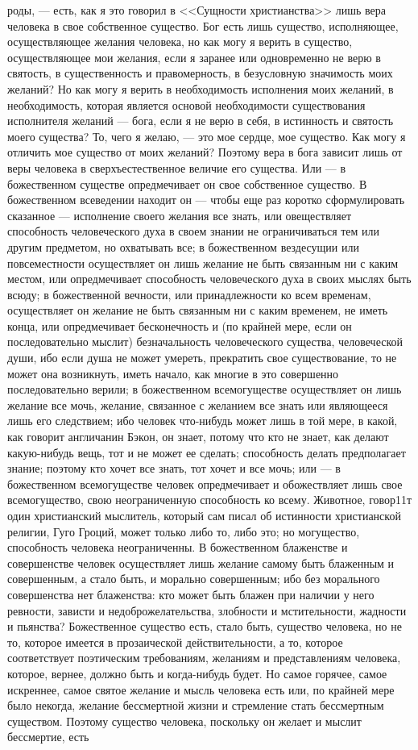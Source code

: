 \documentclass[12pt]{article}
\begin{document}
роды, --- есть, как я это говорил в <<Сущности христианства>>  лишь вера человека в свое собственное существо. Бог есть лишь существо, исполняющее, осуществляющее желания человека, но как могу я верить в существо, осуществляющее мои желания, если я заранее или одновременно не верю в святость, в существенность и правомерность, в безусловную значимость моих желаний? Но как могу я верить в необходимость исполнения моих желаний, в необходимость, которая является основой необходимости существования исполнителя желаний --- бога, если я не верю в себя, в истинность и святость моего существа? То, чего я желаю, --- это мое сердце, мое существо. Как могу я отличить мое существо от моих желаний? Поэтому вера в бога зависит лишь от веры человека в сверхъестественное величие его существа. Или --- в божественном существе опредмечивает он свое собственное существо. В божественном всеведении находит он --- чтобы еще раз коротко сформулировать сказанное --- исполнение своего желания все знать, или овеществляет способность человеческого духа в своем знании не ограничиваться тем или другим предметом, но охватывать все; в божественном вездесущии или повсеместности осуществляет он лишь желание не быть связанным ни с каким местом, или опредмечивает способность человеческого духа в своих мыслях быть всюду; в божественной вечности, или принадлежности ко всем временам, осуществляет он желание не быть связанным ни с каким временем, не иметь конца, или опредмечивает бесконечность и (по крайней мере, если он последовательно мыслит) безначальность человеческого существа, человеческой души, ибо если душа не может умереть, прекратить свое существование, то не может она возникнуть, иметь начало, как многие в это совершенно последовательно верили; в божественном всемогуществе осуществляет он лишь желание все мочь, желание, связанное с желанием все знать или являющееся лишь его следствием; ибо человек что-нибудь может лишь в той мере, в какой, как говорит англичанин Бэкон, он знает, потому что кто не знает, как делают какую-нибудь вещь, тот и не может ее сделать; способность делать предполагает знание; поэтому кто хочет все знать, тот хочет и все мочь; или --- в божественном всемогуществе человек опредмечивает и обожествляет лишь свое всемогущество, свою неограниченную способность ко всему. Животное, говор11т один христианский мыслитель, который сам писал об истинности христианской религии, Гуго Гроций, может только либо то, либо это; но могущество, способность человека неограниченны. В божественном блаженстве и совершенстве человек осуществляет лишь желание самому быть блаженным и совершенным, а стало быть, и морально совершенным; ибо без морального совершенства нет блаженства: кто может быть блажен при наличии у него ревности, зависти и недоброжелательства, злобности и мстительности, жадности и пьянства? Божественное существо есть, стало быть, существо человека, но не то, которое имеется в прозаической действительности, а то, которое соответствует поэтическим требованиям, желаниям и представлениям человека, которое, вернее, должно быть и когда-нибудь будет. Но самое горячее, самое искреннее, самое святое желание и мысль человека есть или, по крайней мере было некогда, желание бессмертной жизни и стремление стать бессмертным существом. Поэтому существо человека, поскольку он желает и мыслит бессмертие, есть 
\end{document}
